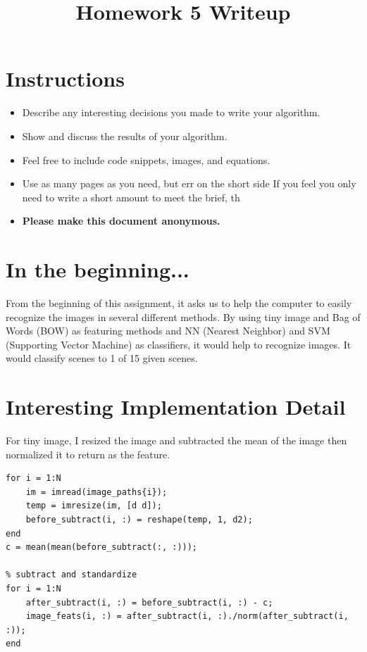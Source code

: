 \title{\vspace{-1cm}Homework 5 Writeup}



\maketitle
\vspace{-3cm}
\thispagestyle{fancy}

\section*{Instructions}
\begin{itemize}
  \item Describe any interesting decisions you made to write your algorithm.
  \item Show and discuss the results of your algorithm.
  \item Feel free to include code snippets, images, and equations.
  \item Use as many pages as you need, but err on the short side If you feel you only need to write a short amount to meet the brief, th
  
  \item \textbf{Please make this document anonymous.}
\end{itemize}

\section*{In the beginning...}

 From the beginning of this assignment, it asks us to help the computer to easily recognize the images in several different methods. By using tiny image and Bag of Words (BOW) as featuring methods and NN (Nearest Neighbor) and SVM (Supporting Vector Machine) as classifiers, it would help to recognize images. It would classify scenes to 1 of 15 given scenes. 

\section*{Interesting Implementation Detail}

For tiny image, I resized the image and subtracted the mean of the image then normalized it to return as the feature. 

\begin{lstlisting}[style=Matlab-editor]
% prepare img
for i = 1:N
    im = imread(image_paths{i});
    temp = imresize(im, [d d]);
    before_subtract(i, :) = reshape(temp, 1, d2);
end
c = mean(mean(before_subtract(:, :)));

% subtract and standardize
for i = 1:N
    after_subtract(i, :) = before_subtract(i, :) - c;
    image_feats(i, :) = after_subtract(i, :)./norm(after_subtract(i, :));
end
\end{lstlisting}


